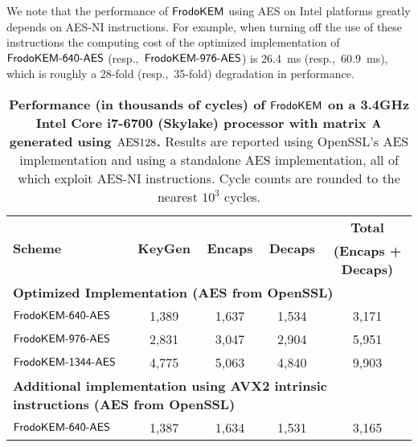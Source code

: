 We note that the performance of $\textsf{\upshape\mdseries FrodoKEM}$ using AES on Intel platforms greatly depends on AES-NI instructions. For example, when turning off the use of these instructions the computing cost of the optimized implementation of $\textsf{\upshape\mdseries FrodoKEM-640-AES}$ (resp.,~$\textsf{\upshape\mdseries FrodoKEM-976-AES}$) is 26.4~ms (resp.,~60.9~ms), which is roughly a 28-fold (resp.,~35-fold) degradation in performance.


\begin{table}[t]
\caption{\textbf{Performance (in thousands of cycles) of $\textsf{\upshape\mdseries FrodoKEM}$ on a 3.4GHz Intel Core i7-6700 (Skylake) processor with matrix $\mathbf{A}$ generated using $\textrm{\upshape\mdseries AES128}$.} Results are reported using OpenSSL's AES implementation and using a standalone AES implementation, all of which exploit AES-NI instructions. Cycle counts are rounded to the nearest $10^3$ cycles.
}\label{tab:results_x64_aes}
\medskip
\centering
\renewcommand{\tabcolsep}{0.4cm}
\renewcommand{\arraystretch}{1.1}
\begin{tabular}{l|c c c|c}
\toprule
\multirow{2}{*}{\textbf{Scheme}}     &     \multirow{2}{*}{\textbf{KeyGen}}      &    \multirow{2}{*}{\textbf{Encaps}}   &    \multirow{2}{*}{\textbf{Decaps}}   &    \textbf{Total}        \\ 
                                                       &                                                            &                                                         &                                                       &    \textbf{(Encaps + Decaps)}   \\
\midrule
\multicolumn{5}{l}{\bf Optimized Implementation (AES from OpenSSL)} \\
\midrule
$\textsf{\upshape\mdseries FrodoKEM-640-AES}$                               &            1,389                &            1,637                   &                 1,534         &                3,171             \\
$\textsf{\upshape\mdseries FrodoKEM-976-AES}$                             &            2,831                &            3,047                   &                 2,904       &                5,951             \\
$\textsf{\upshape\mdseries FrodoKEM-1344-AES}$                             &            4,775                &            5,063                   &                 4,840       &                 9,903             \\
\midrule
\multicolumn{5}{l}{\bf Additional implementation using AVX2 intrinsic instructions (AES from OpenSSL)} \\
\midrule
$\textsf{\upshape\mdseries FrodoKEM-640-AES}$                               &            1,387                &            1,634                   &                 1,531       &                3,165             \\

\end{tabular}
\end{table}
